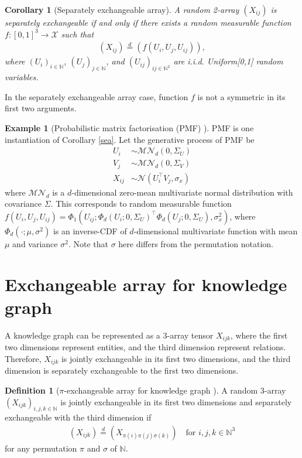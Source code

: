 \documentclass{article}
\newtheorem{corollary}{Corollary}[theorem] %
\theoremstyle{definition}
\newtheorem{definition}{Definition}
\newtheorem{example}{Example}[definition]
\begin{document}
\begin{corollary}[\label{sea}Separately exchangeable array] A random 2-array $(X_{ij})$ is separately exchangeable if and only if there exists a random measurable function $f:[0,1]^3 \rightarrow \mathcal{X}$ such that
\begin{align}
(X_{ij})  \stackrel{d}{=} (f(U_i, U_j, U_{ij})),
\end{align}
where $(U_i)_{i\in \mathbb{N}}$, $(U_j)_{j\in \mathbb{N}}$, and $(U_{ij})_{ij\in \mathbb{N}^2}$ are i.i.d. Uniform[0,1] random variables.
\end{corollary}
In the separately exchangeable array case, function $f$ is not a symmetric in its first two arguments.

\begin{example}[Probabilistic matrix factorisation (PMF) \cite{Salakhutdinov2008}] 
PMF is one instantiation of Corollary \ref{sea}. Let the generative process of PMF be
\begin{align}
U_i &\sim \mathcal{MN}_d(0, \Sigma_U)\\
V_j &\sim \mathcal{MN}_d(0, \Sigma_V)\\
X_{ij} &\sim \mathcal{N}(U_i^\top V_j, \sigma_x)
\end{align}
where $\mathcal{MN}_d$ is a $d$-dimensional zero-mean multivariate normal distribution with covariance $\Sigma$. This corresponds to random measurable function
$f(U_i, U_j, U_{ij}) = \Phi_1(U_{ij}; \Phi_d(U_i;0, \Sigma_{U})^\top \Phi_d(U_j;0, \Sigma_{U}), \sigma^2_x)$, where $\Phi_d(\cdot;\mu, \sigma^2)$ is an inverse-CDF of $d$-dimensional multivariate function with mean $\mu$ and variance $\sigma^2$. Note that $\sigma$ here differs from the permutation notation.
\end{example}

\section{Exchangeable array for knowledge graph}

A knowledge graph can be represented as a 3-array tensor $X_{ijk}$, where the first two dimensions represent entities, and the third dimension represent relations. Therefore, $X_{ijk}$ is jointly exchangeable in its first two dimensions, and the third dimension is separately exchangeable to the first two dimensions.

\begin{definition}[$\pi$-exchangeable array for knowledge graph \cite{Orbanz2015}]A random 3-array $(X_{ijk})_{i,j,k\in \mathbb{N}}$ is jointly exchangeable in its first two dimensions and separately exchangeable with the third dimension if
\begin{align}
(X_{ijk}) \stackrel{d}{=} (X_{\pi(i)\pi(j)\sigma(k)}) \quad \text{for } i,j,k \in \mathbb{N}^3
\end{align}
for any permutation $\pi$ and $\sigma$ of $\mathbb{N}$.
\end{definition}
\end{document}
